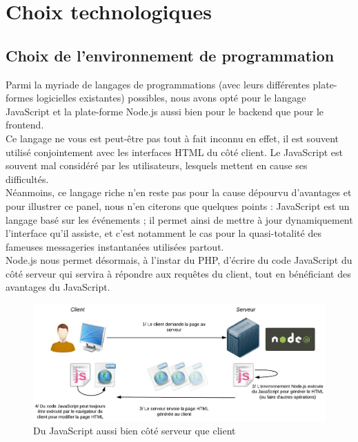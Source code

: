 \section{Choix technologiques}
\label{section:choixTechnologiques}

\subsection*{Choix de l'environnement de programmation}

Parmi la myriade de langages de programmations (avec leurs différentes plate-formes logicielles existantes) possibles, nous avons opté pour le langage JavaScript et la plate-forme Node.js aussi bien pour le \Gls{backend} que pour le \Gls{frontend}. \\

Ce langage ne vous est peut-être pas tout à fait inconnu en effet, il est souvent utilisé conjointement avec les interfaces HTML du côté client. Le JavaScript est souvent mal considéré par les utilisateurs, lesquels mettent en cause ses difficultés. \\

Néanmoins, ce langage riche n’en reste pas pour la cause dépourvu d’avantages et pour illustrer ce panel, nous n'en citerons que quelques points : JavaScript est un langage basé sur les événements ; il permet ainsi de mettre à jour dynamiquement l’interface qu’il assiste, et c’est notamment le cas pour la quasi-totalité des fameuses messageries instantanées utilisées partout.\\

Node.js nous permet désormais, à l'instar du PHP, d'écrire du code JavaScript du côté serveur qui servira à répondre aux requêtes du client, tout en bénéficiant des avantages du JavaScript. \\

\begin{figure}[H]
    \includegraphics[width=\textwidth,height=\textheight,keepaspectratio]{images/SchemaNodejs.png}
    \centering
    \caption[Du JavaScript aussi bien côté serveur que client]{Du JavaScript aussi bien côté serveur que client~\cite{NodejsIllustrations}}
    \label{pic:WhatIsNodeJs}
\end{figure}

